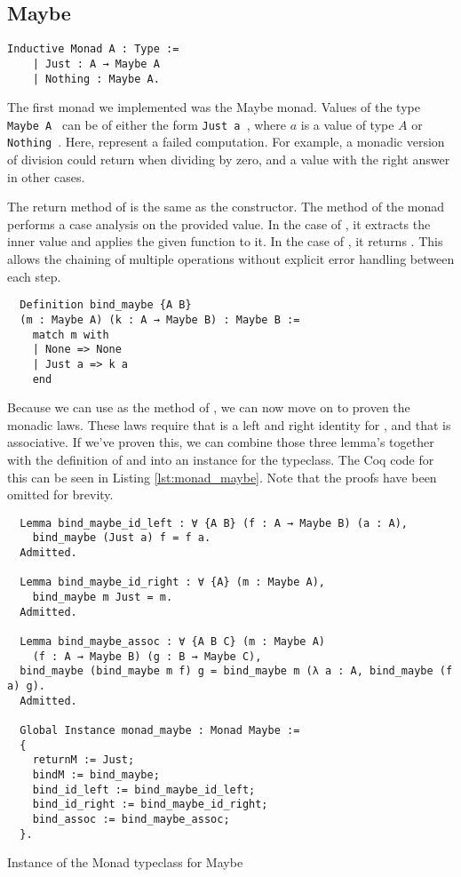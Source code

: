 \subsection{Maybe}
\begin{verbatim}
Inductive Monad A : Type :=
    | Just : A → Maybe A
    | Nothing : Maybe A.
\end{verbatim}

The first monad we implemented was the Maybe monad. Values of the type
\texttt{Maybe A } can be of either the form 
\texttt{Just a }, where $a$ is a value of type $A$ or 
\texttt{Nothing }. Here,  represent a failed
computation. For example, a monadic version of division  could return  when dividing by zero,
and a  value with the right answer in other cases.

The return method of  is the same as the  constructor. 
The  method of the  monad performs a case analysis on the provided
value. In the case of , it extracts the inner value and applies the given
function to it. In the case of , it returns . This allows the chaining
of multiple operations without explicit error handling between each step.

\begin{verbatim}
  Definition bind_maybe {A B} 
  (m : Maybe A) (k : A → Maybe B) : Maybe B :=
    match m with
    | None => None
    | Just a => k a
    end
\end{verbatim}

Because we can use  as the  method of , we
can now move on to proven the monadic laws. These laws require that
 is a left and right identity for , and that  is associative. If we've proven this, we can combine those three lemma's
together with the definition of  and  into an
instance for the  typeclass. The Coq code for this can be seen in
Listing \ref{lst:monad_maybe}. Note that the proofs have been omitted for
brevity.

\begin{listing}
\begin{verbatim}
  Lemma bind_maybe_id_left : ∀ {A B} (f : A → Maybe B) (a : A), 
    bind_maybe (Just a) f = f a.
  Admitted.

  Lemma bind_maybe_id_right : ∀ {A} (m : Maybe A), 
    bind_maybe m Just = m.
  Admitted.

  Lemma bind_maybe_assoc : ∀ {A B C} (m : Maybe A) 
    (f : A → Maybe B) (g : B → Maybe C),
  bind_maybe (bind_maybe m f) g = bind_maybe m (λ a : A, bind_maybe (f a) g).
  Admitted.

  Global Instance monad_maybe : Monad Maybe :=
  {
    returnM := Just;
    bindM := bind_maybe;
    bind_id_left := bind_maybe_id_left;
    bind_id_right := bind_maybe_id_right;
    bind_assoc := bind_maybe_assoc;
  }. 
\end{verbatim}
\caption{Instance of the Monad typeclass for Maybe}
\label{lst:monad_maybe}
\end{listing}

